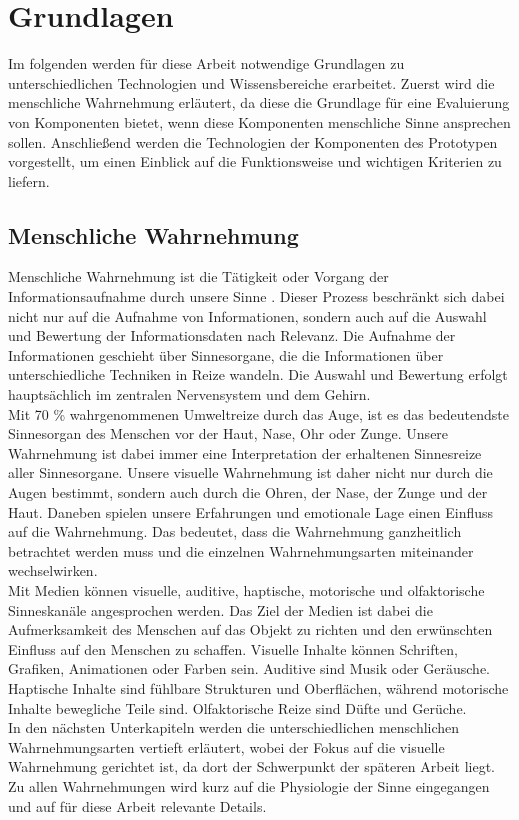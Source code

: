 \chapter{Grundlagen}
\label{cha:Grundlagen}
Im folgenden werden für diese Arbeit notwendige Grundlagen zu unterschiedlichen Technologien und Wissensbereiche erarbeitet. 
Zuerst wird die menschliche Wahrnehmung erläutert, da diese die Grundlage für eine Evaluierung von Komponenten bietet, wenn diese Komponenten menschliche Sinne ansprechen sollen. Anschließend werden die Technologien der Komponenten des Prototypen vorgestellt, um einen Einblick auf die Funktionsweise und wichtigen Kriterien zu liefern.
\section{Menschliche Wahrnehmung}
Menschliche Wahrnehmung ist die \glqq Tätigkeit oder Vorgang der Informationsaufnahme durch unsere Sinne\grqq{} \cite[Seite 12]{Buhler.2017}. Dieser Prozess beschränkt sich dabei nicht nur auf die Aufnahme von Informationen, sondern auch auf die Auswahl und Bewertung der Informationsdaten nach Relevanz. Die Aufnahme der Informationen geschieht über Sinnesorgane, die die Informationen über unterschiedliche Techniken in Reize wandeln. Die Auswahl und Bewertung erfolgt hauptsächlich im zentralen Nervensystem und dem Gehirn. \cite[Vgl. Seite 12]{Buhler.2017}\\
Mit 70 \% wahrgenommenen Umweltreize durch das Auge, ist es das bedeutendste Sinnesorgan des Menschen vor der Haut, Nase, Ohr oder Zunge. Unsere Wahrnehmung ist dabei immer eine Interpretation der erhaltenen Sinnesreize aller Sinnesorgane. Unsere visuelle Wahrnehmung ist daher nicht nur durch die Augen bestimmt, sondern auch durch die Ohren, der Nase, der Zunge und der Haut. Daneben spielen unsere Erfahrungen und emotionale Lage einen Einfluss auf die Wahrnehmung. \cite[Vgl. Seite 13 f.]{Buhler.2017}
Das bedeutet, dass die Wahrnehmung ganzheitlich betrachtet werden muss und die einzelnen Wahrnehmungsarten miteinander wechselwirken.\\
Mit Medien können visuelle, auditive, haptische, motorische und olfaktorische Sinneskanäle angesprochen werden. Das Ziel der Medien ist dabei die Aufmerksamkeit des Menschen auf das Objekt zu richten und den erwünschten Einfluss auf den Menschen zu schaffen. Visuelle Inhalte können Schriften, Grafiken, Animationen oder Farben sein. Auditive sind Musik oder Geräusche. Haptische Inhalte sind fühlbare Strukturen und Oberflächen, während motorische Inhalte bewegliche Teile sind. Olfaktorische Reize sind Düfte und Gerüche. \cite[Vgl. Seite 3]{Buhler.2017}\\
In den nächsten Unterkapiteln werden die unterschiedlichen menschlichen Wahrnehmungsarten vertieft erläutert, wobei der Fokus auf die visuelle Wahrnehmung gerichtet ist, da dort der Schwerpunkt der späteren Arbeit liegt. Zu allen Wahrnehmungen wird kurz auf die Physiologie der Sinne eingegangen und auf für diese Arbeit relevante Details.
